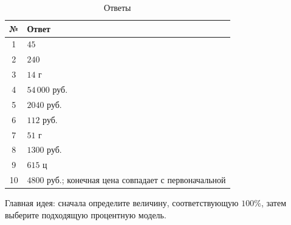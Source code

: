 \documentclass[a4paper,12pt]{article}
\begin{document}
\begin{table}[h]
\centering
\caption{Ответы}
\renewcommand{\arraystretch}{1.45}
\begin{tabularx}{0.82\linewidth}{cX}
\toprule
\textbf{№} & \textbf{Ответ} \\
\midrule
1 & \(45\) \\
2 & \(240\) \\
3 & \(14\) г \\
4 & \(54\,000\) руб. \\
5 & \(2040\) руб. \\
6 & \(112\) руб. \\
7 & \(51\) г \\
8 & \(1300\) руб. \\
9 & \(615\) ц \\
10 & \(4800\) руб.; конечная цена совпадает с первоначальной \\
\bottomrule
\end{tabularx}
\end{table}

\vfill

\begin{center}
\textcolor{muted}{
\small
Главная идея: сначала определите величину, соответствующую \(100\%\),
затем выберите подходящую процентную модель.
}
\end{center}
\end{document}
